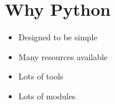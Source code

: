 \section{Why Python}

\frame{\tableofcontents[currentsection]}

\begin{itemize}
  \item Designed to be simple
  \item Many resources available
  \item Lots of tools
  \item Lots of modules
\end{itemize}